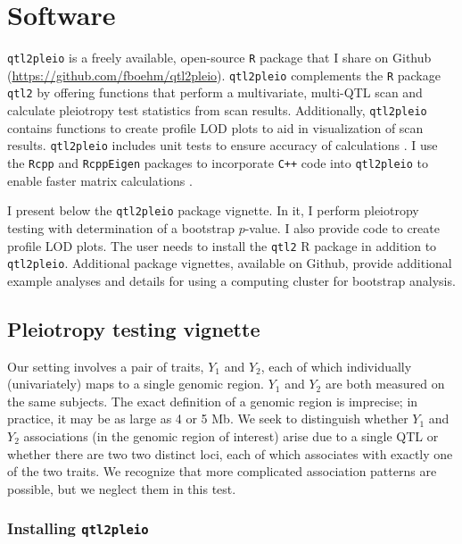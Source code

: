 \documentclass[oneside]{book}\usepackage[]{graphicx}\usepackage[]{color}
\begin{document}

\chapter{Software}

\texttt{qtl2pleio} is a freely available, open-source \texttt{R} \citep{r} package that I share on Github (\url{https://github.com/fboehm/qtl2pleio}). \texttt{qtl2pleio} complements the \texttt{R} package \texttt{qtl2} \citep{broman2019rqtl2} by offering functions that perform a multivariate, multi-QTL scan and calculate pleiotropy test statistics from scan results. Additionally, \texttt{qtl2pleio} contains functions to create profile LOD plots to aid in visualization of scan results. \texttt{qtl2pleio} includes unit tests to ensure accuracy of calculations \citep{wickham2011testthat}. I use the \texttt{Rcpp} and \texttt{RcppEigen} packages to incorporate \texttt{C++} code into \texttt{qtl2pleio} to enable faster matrix calculations \citep{eddelbuettel2011rcpp,bates2013fast}.

I present below the \texttt{qtl2pleio} package vignette. In it, I perform pleiotropy testing with determination of a bootstrap $p$-value. I also provide code to create profile LOD plots. The user needs to install the \texttt{qtl2} R package in addition to \texttt{qtl2pleio}. Additional package vignettes, available on Github, provide additional example analyses and details for using a computing cluster for bootstrap analysis. 

\section{Pleiotropy testing vignette}


Our setting involves a pair of traits, \(Y_1\) and \(Y_2\), each of
which individually (univariately) maps to a single genomic region.
\(Y_1\) and \(Y_2\) are both measured on the same subjects. The exact
definition of a genomic region is imprecise; in practice, it may be as
large as 4 or 5 Mb. We seek to distinguish whether \(Y_1\) and \(Y_2\)
associations (in the genomic region of interest) arise due to a single
QTL or whether there are two two distinct loci, each of which associates
with exactly one of the two traits. We recognize that more complicated
association patterns are possible, but we neglect them in this test.

\hypertarget{installing-qtl2pleio}{%
\subsection{\texorpdfstring{Installing
\texttt{qtl2pleio}}{Installing qtl2pleio}}\label{installing-qtl2pleio}}
\end{document}
